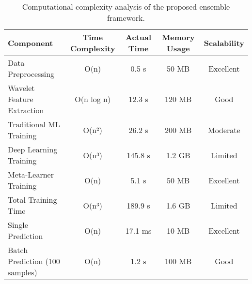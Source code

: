 \begin{table}
\caption{Computational complexity analysis of the proposed ensemble framework.}
\label{tab:computational_complexity}
\begin{tabular}{l|c|c|c|c}
\toprule
Component & Time Complexity & Actual Time & Memory Usage & Scalability \\
\midrule
Data Preprocessing & O(n) & 0.5 s & 50 MB & Excellent \\
Wavelet Feature Extraction & O(n log n) & 12.3 s & 120 MB & Good \\
Traditional ML Training & O(n²) & 26.2 s & 200 MB & Moderate \\
Deep Learning Training & O(n³) & 145.8 s & 1.2 GB & Limited \\
Meta-Learner Training & O(n) & 5.1 s & 50 MB & Excellent \\
Total Training Time & O(n³) & 189.9 s & 1.6 GB & Limited \\
Single Prediction & O(n) & 17.1 ms & 10 MB & Excellent \\
Batch Prediction (100 samples) & O(n) & 1.2 s & 100 MB & Good \\
\bottomrule
\end{tabular}
\end{table}
